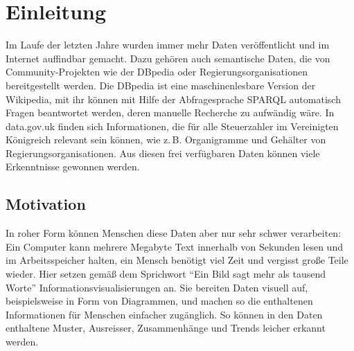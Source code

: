 \documentclass[
	headsepline,
	footsepline,
	fontsize=12pt,
	bibliography=totoc
]{scrbook}
\begin{document}
\frontmatter
{}
\mmtfrontmatter

\listoffigures
\listoftables
\printglossary[type=\acronymtype,style=long,title=Abkürzungsverzeichnis,toctitle=Abkürzungsverzeichnis]

\mainmatter

\chapter{Einleitung}
\label{chapter:einleitung}


Im Laufe der letzten Jahre wurden immer mehr Daten veröffentlicht und im Internet auffindbar gemacht. Dazu gehören auch semantische Daten, die von Community-Projekten wie der DBpedia oder Regierungsorganisationen bereitgestellt werden. Die DBpedia ist eine maschinenlesbare Version der Wikipedia, mit ihr können mit Hilfe der Abfragesprache SPARQL automatisch Fragen beantwortet werden, deren manuelle Recherche zu aufwändig wäre. In data.gov.uk finden sich Informationen, die für alle Steuerzahler im Vereinigten Königreich relevant sein können, wie z.\,B. Organigramme und Gehälter von Regierungsorganisationen. Aus diesen frei verfügbaren Daten können viele Erkenntnisse gewonnen werden.

\section{Motivation}
\label{section:einleitung:motivation}


In roher Form können Menschen diese Daten aber nur sehr schwer verarbeiten: Ein Computer kann mehrere Megabyte Text innerhalb von Sekunden lesen und im Arbeitsspeicher halten, ein Mensch benötigt viel Zeit und vergisst große Teile wieder. Hier setzen gemäß dem Sprichwort \enquote{Ein Bild sagt mehr als tausend Worte} Informationsvisualisierungen an. Sie bereiten Daten visuell auf, beispielsweise in Form von Diagrammen, und machen so die enthaltenen Informationen für Menschen einfacher zugänglich. So können in den Daten enthaltene Muster, Ausreisser, Zusammenhänge und Trends leicher erkannt werden.
\end{document}
